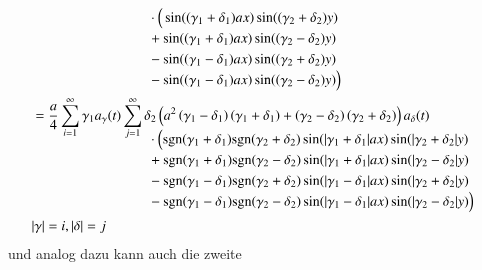 \begin{align*}
\\[-2.5ex]
&\phantom{=abbbbb\sum\sum.....{}}
\cdot
\Big(
\sin((\gamma_1 + \delta_1) ax)\sin((\gamma_2 + \delta_2) y)
\\[-1.0ex]
&\phantom{=abbbbb\sum\sum.....{}}
+
\sin((\gamma_1 + \delta_1) ax)\sin((\gamma_2 - \delta_2) y)
\\[-1.0ex]
&\phantom{=abbbbb\sum\sum.....{}}
-
\sin((\gamma_1 - \delta_1) ax)\sin((\gamma_2 + \delta_2) y)
\\[-1.0ex]
&\phantom{=abbbbb\sum\sum.....{}}
-
\sin((\gamma_1 - \delta_1) ax)\sin((\gamma_2 - \delta_2) y)
\Big)
\\
&=
\frac{a}{4}
\sum_{i = 1}^{\infty}
\gamma_1
a_{\gamma}(t)
\sum_{j = 1}^{\infty}
\delta_2
\left(
a^2 \left(\gamma_1 - \delta_1 \right)\left( \gamma_1 + \delta_1 \right)
+ \left(\gamma_2 - \delta_2 \right)\left( \gamma_2 + \delta_2 \right)
\right)
a_{\delta}(t)
\\[-2.5ex]
&\phantom{=abbbbb\sum\sum.....{}}
\cdot
\Big(
\sgn(\gamma_1 + \delta_1)\sgn(\gamma_2 + \delta_2)
\sin(|\gamma_1 + \delta_1|ax)\sin(|\gamma_2 + \delta_2|y)
\\[-1.0ex]
&\phantom{=abbbbb\sum\sum.....{}}
+
\sgn(\gamma_1 + \delta_1)\sgn(\gamma_2 - \delta_2)
\sin(|\gamma_1 + \delta_1|ax)\sin(|\gamma_2 - \delta_2|y)
\\[-1.0ex]
&\phantom{=abbbbb\sum\sum.....{}}
-
\sgn(\gamma_1 - \delta_1)\sgn(\gamma_2 + \delta_2)
\sin(|\gamma_1 - \delta_1|ax)\sin(|\gamma_2 + \delta_2|y)
\\[-1.0ex]
&\phantom{=abbbbb\sum\sum.....{}}
-
\sgn(\gamma_1 - \delta_1)\sgn(\gamma_2 - \delta_2)
\sin(|\gamma_1 - \delta_1|ax)\sin(|\gamma_2 - \delta_2|y)
\Big)
\\
&|\gamma| = i, |\delta| = j
\end{align*}
und analog dazu kann auch die zweite
